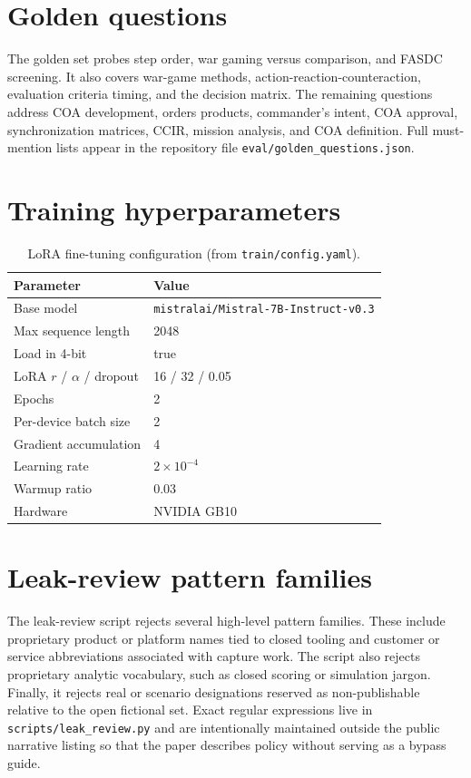 \documentclass[11pt]{article}
\begin{document}
\section{Golden questions}
\label{app:golden}

The golden set probes step order, war gaming versus comparison, and FASDC
screening.
It also covers war-game methods, action-reaction-counteraction, evaluation
criteria timing, and the decision matrix.
The remaining questions address COA development, orders products, commander's
intent, COA approval, synchronization matrices, CCIR, mission analysis, and
COA definition.
Full must-mention lists appear in the repository file
\texttt{eval/golden\_questions.json}.

\section{Training hyperparameters}
\label{app:hparams}

\begin{table}[h]
  \centering
  \caption{LoRA fine-tuning configuration (from \texttt{train/config.yaml}).}
  \label{tab:hparams}
  \begin{tabular}{ll}
    \toprule
    Parameter & Value \\
    \midrule
    Base model & \texttt{mistralai/Mistral-7B-Instruct-v0.3} \\
    Max sequence length & 2048 \\
    Load in 4-bit & true \\
    LoRA $r$ / $\alpha$ / dropout & 16 / 32 / 0.05 \\
    Epochs & 2 \\
    Per-device batch size & 2 \\
    Gradient accumulation & 4 \\
    Learning rate & $2{\times}10^{-4}$ \\
    Warmup ratio & 0.03 \\
    Hardware & NVIDIA GB10 \\
    \bottomrule
  \end{tabular}
\end{table}

\section{Leak-review pattern families}
\label{app:leak}

The leak-review script rejects several high-level pattern families.
These include proprietary product or platform names tied to closed tooling and
customer or service abbreviations associated with capture work.
The script also rejects proprietary analytic vocabulary, such as closed scoring
or simulation jargon.
Finally, it rejects real or scenario designations reserved as non-publishable
relative to the open fictional set.
Exact regular expressions live in \texttt{scripts/leak\_review.py} and are
intentionally maintained outside the public narrative listing so that the
paper describes policy without serving as a bypass guide.
\end{document}

